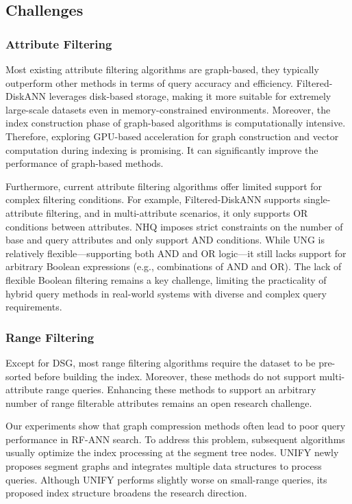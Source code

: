 \documentclass[sigconf, nonacm]{acmart}
\begin{document}
\subsection{Challenges}
\subsubsection{\textbf{Attribute Filtering}}
Most existing attribute filtering algorithms are graph-based, they typically outperform other methods in terms of query accuracy and efficiency. Filtered-DiskANN leverages disk-based storage, making it more suitable for extremely large-scale datasets even in memory-constrained environments. Moreover, the index construction phase of graph-based algorithms is computationally intensive. Therefore, exploring GPU-based acceleration for graph construction and vector computation during indexing is promising. It can significantly improve the performance of graph-based methods.

Furthermore, current attribute filtering algorithms offer limited support for complex filtering conditions. For example, Filtered-DiskANN  supports single-attribute filtering, and in multi-attribute scenarios, it only supports OR conditions between attributes. 
NHQ imposes strict constraints on the number of base and query attributes and only support AND conditions. While UNG is relatively flexible—supporting both AND and OR logic—it still lacks support for arbitrary Boolean expressions (e.g., combinations of AND and OR). The lack of flexible Boolean filtering remains a key challenge, limiting the practicality of hybrid query methods in real-world systems with diverse and complex query requirements.

\subsubsection{\textbf{Range Filtering}}

Except for DSG, most range filtering algorithms require the dataset to be pre-sorted before building the index. Moreover, these methods do not support multi-attribute range queries. Enhancing these methods to support an arbitrary number of range filterable attributes remains an open research challenge.

Our experiments show that graph compression methods often lead to poor query performance in RF-ANN search. To address this problem, subsequent algorithms usually optimize the index processing at the segment tree nodes. UNIFY newly proposes segment graphs and integrates multiple data structures to process queries. Although UNIFY performs slightly worse on small-range queries, its proposed index structure broadens the research direction.
\end{document}
